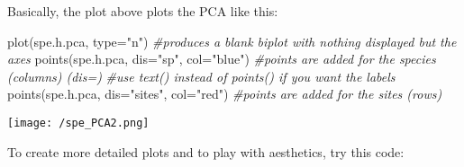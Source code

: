 \documentclass[
]{book}
\newenvironment{Shaded}{\begin{snugshade}}{\end{snugshade}}
\newcommand{\AttributeTok}[1]{\textcolor[rgb]{0.77,0.63,0.00}{#1}}
\newcommand{\CommentTok}[1]{\textcolor[rgb]{0.56,0.35,0.01}{\textit{#1}}}
\newcommand{\FunctionTok}[1]{\textcolor[rgb]{0.00,0.00,0.00}{#1}}
\newcommand{\NormalTok}[1]{#1}
\newcommand{\StringTok}[1]{\textcolor[rgb]{0.31,0.60,0.02}{#1}}
\begin{document}
Basically, the plot above plots the PCA like this:

\begin{Shaded}
\begin{Highlighting}[]
\FunctionTok{plot}\NormalTok{(spe.h.pca, }\AttributeTok{type=}\StringTok{"n"}\NormalTok{) }\CommentTok{\#produces a blank biplot with nothing displayed but the axes}
\FunctionTok{points}\NormalTok{(spe.h.pca, }\AttributeTok{dis=}\StringTok{"sp"}\NormalTok{, }\AttributeTok{col=}\StringTok{"blue"}\NormalTok{) }\CommentTok{\#points are added for the species (columns) (dis=)}
\CommentTok{\#use text() instead of points() if you want the labels}
\FunctionTok{points}\NormalTok{(spe.h.pca, }\AttributeTok{dis=}\StringTok{"sites"}\NormalTok{, }\AttributeTok{col=}\StringTok{"red"}\NormalTok{) }\CommentTok{\#points are added for the sites (rows)}
\end{Highlighting}
\end{Shaded}

\texttt{[image: /spe\_PCA2.png]}

To create more detailed plots and to play with aesthetics, try this
code:
\end{document}
